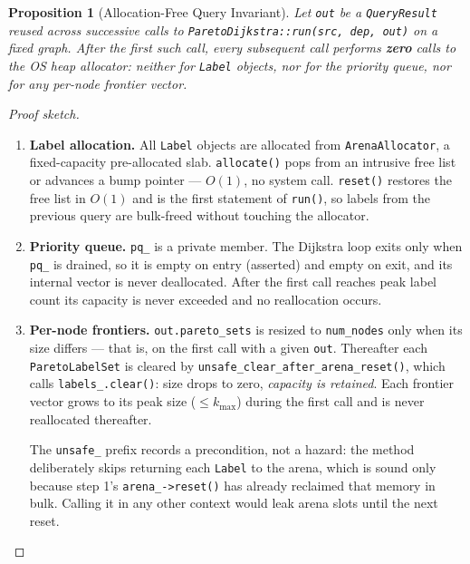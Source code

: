 \documentclass[11pt, a4paper]{article}
\newtheorem{proposition}[theorem]{Proposition}
\theoremstyle{remark}
\begin{document}
\begin{proposition}[Allocation-Free Query Invariant]
    \label{prop:alloc-free}
    Let \texttt{out} be a \texttt{QueryResult} reused across successive calls to
    \texttt{ParetoDijkstra::run(src, dep, out)} on a fixed graph. After the first
    such call, every subsequent call performs \textbf{zero} calls to the OS heap
    allocator: neither for \texttt{Label} objects, nor for the priority queue, nor
    for any per-node frontier vector.
\end{proposition}

\begin{proof}[Proof sketch]
    \begin{enumerate}
        \item \textbf{Label allocation.} All \texttt{Label} objects are
              allocated from \texttt{ArenaAllocator}, a fixed-capacity
              pre-allocated slab. \texttt{allocate()} pops from an intrusive
              free list or advances a bump pointer — $O(1)$, no system call.
              \texttt{reset()} restores the free list in $O(1)$ and is the first
              statement of \texttt{run()}, so labels from the previous query are
              bulk-freed without touching the allocator.

        \item \textbf{Priority queue.} \texttt{pq\_} is a private member. The
              Dijkstra loop exits only when \texttt{pq\_} is drained, so it is
              empty on entry (asserted) and empty on exit, and its internal vector
              is never deallocated. After the first call reaches peak label count
              its capacity is never exceeded and no reallocation occurs.

        \item \textbf{Per-node frontiers.} \texttt{out.pareto\_sets} is resized to
              \texttt{num\_nodes} only when its size differs — that is, on the
              first call with a given \texttt{out}. Thereafter each
              \texttt{ParetoLabelSet} is cleared by
              \texttt{unsafe\_clear\_after\_arena\_reset()}, which calls
              \texttt{labels\_.clear()}: size drops to zero, \emph{capacity is
              retained}. Each frontier vector grows to its peak size
              ($\le k_{\max}$) during the first call and is never reallocated
              thereafter.

              The \texttt{unsafe\_} prefix records a precondition, not a hazard:
              the method deliberately skips returning each \texttt{Label} to the
              arena, which is sound only because step 1's \texttt{arena\_->reset()}
              has already reclaimed that memory in bulk. Calling it in any other
              context would leak arena slots until the next reset.


\end{enumerate}
\end{proof}
\end{document}
